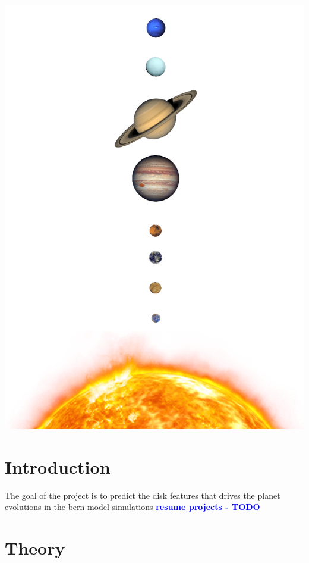 \documentclass[a4paper, 11pt]{article}
\newcommand{\todonote}[3] {
	\textbf{\textcolor{#2}{#3 - #1}}
}
\newcommand{\todo}[1] {\todonote{TODO}{blue}{#1}}
\begin{document}
\begin{titlepage}
    	\begin{center}  \includegraphics[width=.9\linewidth]{images/solar_system_firstpage.png}  
    	\end{center}
		    	
    	
       
    	\end{titlepage}
    	
    	\restoregeometry
    	
    	\newpage
    	\thispagestyle{empty}       
    	\newpage
    

    
    \section{Introduction}
    The goal of the project is to predict the disk features that drives the planet evolutions in the bern model simulations \todo{resume projects}
    
    
    \section{Theory}
   
\end{document}
